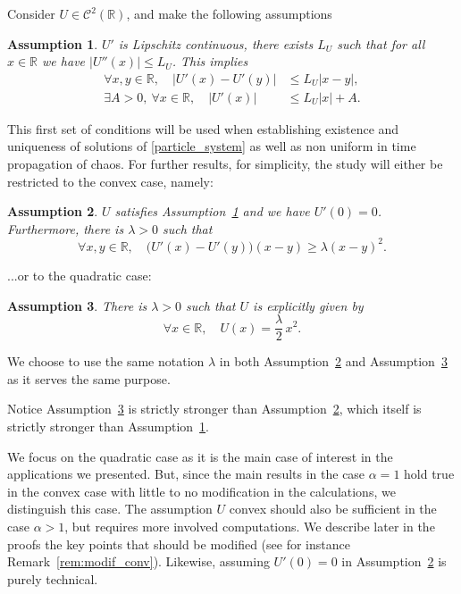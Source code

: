 \documentclass[10pt]{amsart}
\theoremstyle{plain}
\newtheorem{assumption}{Assumption}
\theoremstyle{definition}
\begin{document}
Consider $U\in\mathcal{C}^2(\mathbb{R})$, and make the following assumptions
\begin{assumption}\label{Hyp_U_lip}
$U'$ is Lipschitz continuous, \ie there exists $L_U$ such that for all $x\in\mathbb{R}$ we have $\left|U''(x)\right|\leq L_U$. This implies\vspace*{-3pt}
\begin{align*}
\forall x,y\in\mathbb{R},\quad \left|U'(x)-U'(y)\right|&\leq L_U|x-y|,
\\
\tag*{and}
\exists A>0,\ \forall x\in\mathbb{R},\quad \left|U'(x)\right|&\leq L_U| x|+A.
\end{align*}
\end{assumption}
This first set of conditions will be used when establishing existence and uniqueness of solutions of \eqref{particle_system} as well as non uniform in time propagation of chaos. For further results, for simplicity, the study will either be restricted to the convex case, namely:

\begin{assumption}\label{Hyp_U_conv}$U$ satisfies Assumption~\ref{Hyp_U_lip} and we have $U'(0)=0$. Furthermore,
there is $\lambda>0$ such that\vspace*{-3pt}
\[
\forall x,y\in\mathbb{R},\quad \bigl(U'(x)-U'(y)\bigr)(x-y)\geq \lambda(x-y)^2.
\]
\end{assumption}
\noindent
...or to the quadratic case:
\begin{assumption}\label{Hyp_U_quad}
There is $\lambda>0$ such that $U$ is explicitly given by\vspace*{-3pt}
\[
\forall x\in\mathbb{R},\quad U(x)=\frac{\lambda}{2}\,x^2.
\]
\end{assumption}
We choose to use the same notation $\lambda$ in both Assumption~\ref{Hyp_U_conv} and Assumption~\ref{Hyp_U_quad} as it serves the same purpose.

Notice Assumption~\ref{Hyp_U_quad} is strictly stronger than Assumption~\ref{Hyp_U_conv}, which itself is strictly stronger than Assumption~\ref{Hyp_U_lip}.

We focus on the quadratic case as it is the main case of interest in the applications we presented. But, since the main results in the case $\alpha=1$ hold true in the convex case with little to no modification in the calculations, we distinguish this case. The assumption $U$ convex should also be sufficient in the case $\alpha>1$, but requires more involved computations. We describe later in the proofs the key points that should be modified (see for instance Remark~\ref{rem:modif_conv}). Likewise, assuming $U'(0)=0$ in Assumption~\ref{Hyp_U_conv} is purely technical.
\end{document}
